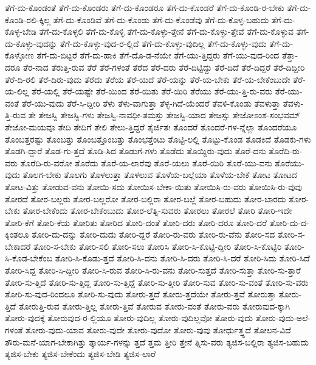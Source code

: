 {ತೆಗೆ-ದು-ಕೊಂಡಂತೆ
ತೆಗೆ-ದು-ಕೊಂಡರು
ತೆಗೆ-ದು-ಕೊಂಡರೂ
ತೆಗೆ-ದು-ಕೊಂಡರೆ
ತೆಗೆ-ದು-ಕೊಂಡಿ-ರ-ಬೇಕು
ತೆಗೆ-ದು-ಕೊಂಡಿ-ರಲಿ-ಕ್ಕಿಲ್ಲ
ತೆಗೆ-ದು-ಕೊಂಡಿವೆ
ತೆಗೆ-ದು-ಕೊಂಡು
ತೆಗೆ-ದು-ಕೊಂಡೆವು
ತೆಗೆ-ದು-ಕೊಳ್ಳ-ಬಹುದು
ತೆಗೆ-ದು-ಕೊಳ್ಳ-ಬೇಡಿ
ತೆಗೆ-ದು-ಕೊಳ್ಳಲಿ
ತೆಗೆ-ದು-ಕೊಳ್ಳಿ
ತೆಗೆ-ದು-ಕೊಳ್ಳು-ತ್ತೇನೆ
ತೆಗೆ-ದು-ಕೊಳ್ಳು-ತ್ತೇವೆ
ತೆಗೆ-ದು-ಕೊಳ್ಳುವ
ತೆಗೆ-ದು-ಕೊಳ್ಳು-ವುದನ್ನು
ತೆಗೆ-ದು-ಕೊಳ್ಳು-ವುದ-ರ-ಲ್ಲಿದೆ
ತೆಗೆ-ದು-ಕೊಳ್ಳು-ವುದಿಲ್ಲ
ತೆಗೆ-ದು-ಕೊಳ್ಳು-ವುದು
ತೆಗೆ-ದು-ಕೊಳ್ಳೋಣ
ತೆಗೆ-ದು-ಬಿಟ್ಟರೆ
ತೆಗೆ-ದು-ಹಾಕಿ
ತೆಗೆ-ದೊ-ಡ-ನೆಯೇ
ತೆಗೆ-ಯು-ತ್ತಿದ್ದರು
ತೆಗೆ-ಯು-ವುದ-ರಿಂದ
ತೆತ್ತಾ-ದರೂ
ತೆರ-ನಾದ
ತೆರುತ್ತಿ-ರುವ
ತೆರೆ
ತೆರೆ-ಗಳಂತೆ
ತೆರೆದ
ತೆರೆ-ದರು
ತೆರೆ-ದಿಟ್ಟಿದ್ದು
ತೆರೆ-ದಿದೆ
ತೆರೆ-ದಿದ್ದರೆ
ತೆರೆ-ದಿದ್ದೀರಿ
ತೆರೆ-ದಿ-ರಲಿ
ತೆರೆ-ದಿರು-ವುದು
ತೆರೆದು
ತೆರೆಯ
ತೆರೆ-ಯದೆ
ತೆರೆ-ಯನ್ನು
ತೆರೆ-ಯ-ಬೇಕು
ತೆರೆ-ಯ-ಬೇಕೆಂಬುದೇ
ತೆರೆ-ಯ-ಲಿಲ್ಲ
ತೆರೆ-ಯಲ್ಲಿ
ತೆರೆ-ಯಷ್ಟೇ
ತೆರೆ-ಯಿಂದ
ತೆರೆ-ಯಿತು
ತೆರೆ-ಯಿರಿ
ತೆರೆಯು
ತೆರೆ-ಯು-ತ್ತಿ-ರು-ವರು
ತೆರೆ-ಯು-ವಂತೆ
ತೆರೆ-ಯು-ವುದು
ತೆರೆ-ಸಿ-ದ್ದೀರಿ
ತೆಳು
ತೆಳು-ವಾಗುತ್ತಾ
ತೆಳ್ಳ-ಗಿದೆ-ಯೆಂದರೆ
ತೆವಳಿ-ಕೊಂಡು
ತೆವಳುತ್ತಾ
ತೆವಳು-ತ್ತಿ-ರುವ
ತೇ
ತೇಜಸ್ವಿ
ತೇಜಸ್ವಿ-ಗಳು
ತೇಜಸ್ವಿ-ನಾವಧೀ-ತಮಸ್ತು
ತೇಜಸ್ವಿ-ಯಾದ
ತೇಜಸ್ಸು
ತೇಜೋಽಂಶ-ಸಂಭವಮ್
ತೇಜೋ-ಮಯವೂ
ತೇದಿ
ತೇದಿಗೆ
ತೇಲಿ
ತೇಲು-ತ್ತಿದ್ದರೆ
ತೈರ್ಜಿತಃ
ತೊಂದರೆ
ತೊಂದರೆ-ಗಳ-ನ್ನೆಲ್ಲಾ
ತೊಂದರೆಯೂ
ತೊಂಬತ್ತರಷ್ಟು
ತೊಂಬತ್ತು
ತೊಂಬತ್ತೊಂಬತ್ತು
ತೊಂಭತ್ತೆಂಟು
ತೊಟ್ಟಿ-ಲಲ್ಲಿ
ತೊಟ್ಟು-ಕೊಂಡ
ತೊಡಕಿದೆ
ತೊಡಕು-ಗಳು
ತೊಡಗಿ-ದ್ದಾರೆ
ತೊಡ-ಗು-ತ್ತದೆ
ತೊಡಿ-ಸಿದ
ತೊಡುಗೆ-ಗಳು
ತೊಡೆದು
ತೊಯ್ದಿರು-ವುದು
ತೊರೆ-ದನು
ತೊರೆದಿ-ರು-ವರು
ತೊರೆದಿ-ರು-ವರೋ
ತೊರೆದು
ತೊರೆ-ಯ-ಲಾರೆವು
ತೊರೆ-ಯಲು
ತೊರೆ-ಯಿರಿ
ತೊರೆ-ಯು-ವನು
ತೊರೆಯು-ವುದು
ತೊಲಗ-ಬೇಕು
ತೊಲಗು
ತೊಳಲುತ್ತಾ
ತೊಳಲುವ
ತೊಳೆಯ-ಬಲ್ಲೆಯಾ
ತೊಳೆಯ-ಬೇಕೆ
ತೋಟ
ತೋಟದ
ತೋಟ-ವಿತ್ತು
ತೋಡುವ-ವನು
ತೋಯಿ-ಸದು
ತೋಯಿಸ-ಬೇಕಾ-ಯಿತು
ತೋಯಿಸಿ-ರು-ವರು
ತೋಯಿಸಿ-ರು-ವುವು
ತೋರದೆ
ತೋರ-ಬಲ್ಲರು
ತೋರ-ಬಲ್ಲರೋ
ತೋರ-ಬಲ್ಲಿರಾ
ತೋರ-ಬಲ್ಲೆ
ತೋರ-ಬಹುದು
ತೋರ-ಬಾರದು
ತೋರ-ಬೇಕು
ತೋರ-ಬೇಕೆಂದು
ತೋರ-ಬೇಕೆಂಬುದು
ತೋರ-ಲೆತ್ನಿ-ಸುವರು
ತೋರಲು
ತೋರಲೆ
ತೋರಿ
ತೋರಿ-ಇದೇ
ತೋರಿ-ಕೆಗೆ
ತೋರಿ-ಕೆಯ
ತೋರಿತು
ತೋರಿದ
ತೋರಿ-ದಂತೆ
ತೋರಿ-ದರು
ತೋರಿ-ದರೂ
ತೋರಿ-ದರೆ
ತೋರಿ-ದು-ದ-ಕ್ಕಿಂತಲೂ
ತೋರಿ-ದು-ದನ್ನು
ತೋರಿ-ದುದು
ತೋರಿ-ದ್ದರೆ
ತೋರಿ-ರು-ವರು
ತೋರಿ-ರು-ವೆನು
ತೋರಿ-ಸದ
ತೋರಿ-ಸ-ಬೇಕಾದರೆ
ತೋರಿ-ಸ-ಬೇಕು
ತೋರಿ-ಸಲಿ
ತೋರಿ-ಸಲು
ತೋರಿಸಿ
ತೋರಿ-ಸಿ-ಕೊಟ್ಟಿ-ದ್ದೀರಿ
ತೋರಿ-ಸಿ-ಕೊಟ್ಟಿರಿ
ತೋರಿ-ಸಿ-ಕೊಡ-ಬೇಕೆಂಬ
ತೋರಿ-ಸಿ-ಕೊಡು-ತ್ತದೆ
ತೋರಿ-ಸಿ-ದನು
ತೋರಿ-ಸಿ-ದರು
ತೋರಿ-ಸಿ-ದರೆ
ತೋರಿ-ಸಿದು
ತೋರಿ-ಸಿದೆ
ತೋರಿ-ಸಿದ್ದ
ತೋರಿ-ಸಿ-ದ್ದೀರಿ
ತೋರಿ-ಸಿ-ರುವ
ತೋರಿ-ಸಿ-ರು-ವನು
ತೋರಿ-ಸುತ್ತದೆ
ತೋರಿ-ಸುತ್ತಾ
ತೋರಿ-ಸು-ತ್ತಾರೆ
ತೋರಿ-ಸು-ತ್ತಿದೆ
ತೋರಿ-ಸು-ತ್ತಿದ್ದ
ತೋರಿ-ಸು-ತ್ತಿದ್ದೆ
ತೋರಿ-ಸು-ತ್ತೀರಿ
ತೋರಿ-ಸುವ
ತೋರಿ-ಸು-ವಂತೆ
ತೋರಿ-ಸು-ವರು
ತೋರಿ-ಸು-ವುದ-ರಿಂದಲೂ
ತೋರಿ-ಸು-ವುದು
ತೋರು-ತ್ತದೆ
ತೋರು-ತ್ತದೆಯೇ
ತೋರು-ತ್ತವೆ
ತೋರುತ್ತಾ
ತೋರು-ತ್ತಿದೆ
ತೋರುತ್ತಿ-ರುವ
ತೋರು-ತ್ತಿಲ್ಲ
ತೋರು-ತ್ತಿವೆ
ತೋರುವ
ತೋರು-ವಂತೆ
ತೋರು-ವರು
ತೋರುವುದ-ಕ್ಕಾಗಿ
ತೋರು-ವುದಕ್ಕೆ
ತೋರುವುದ-ರ-ಲ್ಲಿಯೂ
ತೋರು-ವುದಿಲ್ಲ
ತೋರು-ವುದಿಲ್ಲವೋ
ತೋರು-ವುದು
ತೋರು-ವುದು-ಅಲೆ-ಗಳಂತೆ
ತೋರು-ವುದು-ಯಾವ
ತೋರು-ವುದೇ
ತೋರು-ವುದೋ
ತೋರು-ವುವು
ತೋರ್ಧುತ್ತ್ಧದೆ
ತೋಲನ-ವಿದೆ
ತೌರು-ಮನೆ-ಯಾಗ-ಬೇಕಾಗಿತ್ತು
ತ್ಕಾರ್ಯ-ಗಳನ್ನು
ತ್ತದೆ
ತ್ತಮ
ತ್ತೀರಿ
ತ್ತೇನೆ
ತ್ನಿಸು-ವರು
ತ್ಯಜಿಸ-ಬಲ್ಲಿರಾ
ತ್ಯಜಿಸ-ಬಹುದು
ತ್ಯಜಿಸ-ಬೇಕು
ತ್ಯಜಿಸ-ಬೇಕೆಂದು
ತ್ಯಜಿಸ-ಬೇಡಿ
ತ್ಯಜಿಸ-ಲಾರೆ
}
